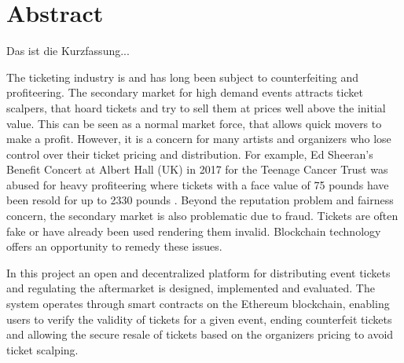 \chapter*{Abstract}


Das ist die Kurzfassung...




The ticketing industry is and has long been subject to counterfeiting and profiteering. The secondary market for high demand events attracts ticket scalpers, that hoard tickets and try to sell them at prices well above the initial value. This can be seen as a normal market force, that allows quick movers to make a profit. However, it is a concern for many artists and organizers who lose control over their ticket pricing and distribution. For example, Ed Sheeran's Benefit Concert at Albert Hall (UK) in 2017 for the Teenage Cancer Trust was abused for heavy profiteering where tickets with a face value of 75 pounds have been resold for up to 2330 pounds \cite{ed-sheeran-concert-ticket-prices}. Beyond the reputation problem and fairness concern, the secondary market is also problematic due to fraud. Tickets are often fake or have already been used rendering them invalid. 
Blockchain technology offers an opportunity to remedy these issues. 

In this project an open and decentralized platform for distributing event tickets and regulating the aftermarket is designed, implemented and evaluated. The system operates through smart contracts on the Ethereum blockchain, enabling users to verify the validity of tickets for a given event, ending counterfeit tickets and allowing the secure resale of tickets based on the organizers pricing to avoid ticket scalping.